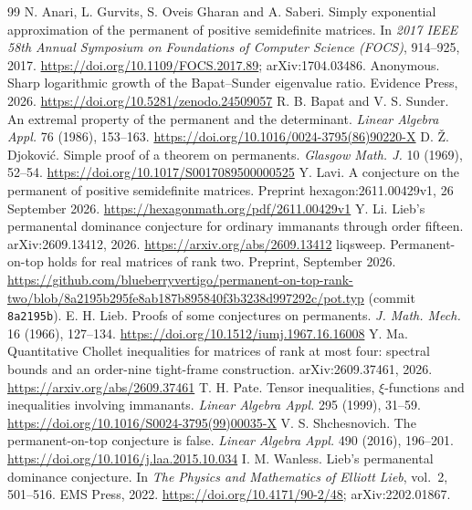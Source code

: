 \documentclass[11pt,a4paper]{article}
\theoremstyle{remark}
\begin{document}
\begin{thebibliography}{99}\small\setlength{\itemsep}{2pt}
 N. Anari, L. Gurvits, S. Oveis Gharan and A. Saberi. Simply exponential approximation of the permanent of positive semidefinite matrices. In \emph{2017 IEEE 58th Annual Symposium on Foundations of Computer Science (FOCS)}, 914--925, 2017. \url{https://doi.org/10.1109/FOCS.2017.89}; arXiv:1704.03486.
 Anonymous. Sharp logarithmic growth of the Bapat--Sunder eigenvalue ratio. Evidence Press, 2026. \url{https://doi.org/10.5281/zenodo.24509057}
 R. B. Bapat and V. S. Sunder. An extremal property of the permanent and the determinant. \emph{Linear Algebra Appl.} 76 (1986), 153--163. \url{https://doi.org/10.1016/0024-3795(86)90220-X}
 D. \v{Z}. Djokovi\'c. Simple proof of a theorem on permanents. \emph{Glasgow Math. J.} 10 (1969), 52--54. \url{https://doi.org/10.1017/S0017089500000525}
 Y. Lavi. A conjecture on the permanent of positive semidefinite matrices. Preprint hexagon:2611.00429v1, 26 September 2026. \url{https://hexagonmath.org/pdf/2611.00429v1}
 Y. Li. Lieb's permanental dominance conjecture for ordinary immanants through order fifteen. arXiv:2609.13412, 2026. \url{https://arxiv.org/abs/2609.13412}
 liqsweep. Permanent-on-top holds for real matrices of rank two. Preprint, September 2026. \url{https://github.com/blueberryvertigo/permanent-on-top-rank-two/blob/8a2195b295fe8ab187b895840f3b3238d997292c/pot.typ} (commit \texttt{8a2195b}).
 E. H. Lieb. Proofs of some conjectures on permanents. \emph{J. Math. Mech.} 16 (1966), 127--134. \url{https://doi.org/10.1512/iumj.1967.16.16008}
 Y. Ma. Quantitative Chollet inequalities for matrices of rank at most four: spectral bounds and an order-nine tight-frame construction. arXiv:2609.37461, 2026. \url{https://arxiv.org/abs/2609.37461}
 T. H. Pate. Tensor inequalities, $\xi$-functions and inequalities involving immanants. \emph{Linear Algebra Appl.} 295 (1999), 31--59. \url{https://doi.org/10.1016/S0024-3795(99)00035-X}
 V. S. Shchesnovich. The permanent-on-top conjecture is false. \emph{Linear Algebra Appl.} 490 (2016), 196--201. \url{https://doi.org/10.1016/j.laa.2015.10.034}
 I. M. Wanless. Lieb's permanental dominance conjecture. In \emph{The Physics and Mathematics of Elliott Lieb}, vol.~2, 501--516. EMS Press, 2022. \url{https://doi.org/10.4171/90-2/48}; arXiv:2202.01867.
\end{thebibliography}
\end{document}
